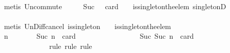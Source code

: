 \begin{isabellebody}
\ \ \ \ \ \ \ \ \ \ \ \ \isamarkupfalse%
\ {\isacharparenleft}metis\ Un{\isacharunderscore}commute\ {\isacartoucheopen}{\isasymnot}\ {\isasymsigma}\ {\isasymsubseteq}\ {\isasymsigma}{\isacharprime}\ {\isasymand}\ Suc\ {}\ {\isacharequal}\ card\ {\isacharparenleft}{\isasymsigma}\ {\isacharminus}\ {\isasymsigma}{\isacharprime}{\isacharparenright}{\isacartoucheclose}\ is{\isacharunderscore}singleton{\isacharunderscore}the{\isacharunderscore}elem\ singletonD{\isacharparenright}\isanewline
\ \ \ \ \ \ \ \ \ \ \isamarkupfalse%
\ \isamarkupfalse%
\ {\isachardoublequoteopen}{\isasymsigma}\ {\isasymunion}\ {\isasymsigma}{\isacharprime}\ {\isasymin}\ {\isasymSigma}{\isachardoublequoteclose}\isanewline
\ \ \ \ \ \ \ \ \ \ \ \ \isamarkupfalse%
\ {\isacharparenleft}metis\ Un{\isacharunderscore}Diff{\isacharunderscore}cancel{}\ {\isacartoucheopen}is{\isacharunderscore}singleton\ {\isacharparenleft}{\isasymsigma}\ {\isacharminus}\ {\isasymsigma}{\isacharprime}{\isacharparenright}{\isacartoucheclose}\ is{\isacharunderscore}singleton{\isacharunderscore}the{\isacharunderscore}elem{\isacharparenright}\ \ \ \isanewline
\ \ \ \ \ \ \ \ \isamarkupfalse%
\ \isanewline
\ \ \ \ \ \ \ \ \ \ \isamarkupfalse%
\ {\isachardoublequoteopen}{\isasymAnd}n{\isachardot}\ {\isasymforall}{\isasymsigma}{\isasymin}{\isasymSigma}{\isachardot}\ {\isasymforall}{\isasymsigma}{\isacharprime}{\isasymin}{\isasymSigma}{\isachardot}\ {\isasymnot}\ {\isasymsigma}\ {\isasymsubseteq}\ {\isasymsigma}{\isacharprime}\ {\isasymand}\ Suc\ n\ {\isacharequal}\ card\ {\isacharparenleft}{\isasymsigma}\ {\isacharminus}\ {\isasymsigma}{\isacharprime}{\isacharparenright}\ {\isasymlongrightarrow}\ {\isasymsigma}\ {\isasymunion}\ {\isasymsigma}{\isacharprime}\ {\isasymin}\ {\isasymSigma}\ {\isasymLongrightarrow}\ {\isasymforall}{\isasymsigma}{\isasymin}{\isasymSigma}{\isachardot}\ {\isasymforall}{\isasymsigma}{\isacharprime}{\isasymin}{\isasymSigma}{\isachardot}\ {\isasymnot}\ {\isasymsigma}\ {\isasymsubseteq}\ {\isasymsigma}{\isacharprime}\ {\isasymand}\ Suc\ {\isacharparenleft}Suc\ n{\isacharparenright}\ {\isacharequal}\ card\ {\isacharparenleft}{\isasymsigma}\ {\isacharminus}\ {\isasymsigma}{\isacharprime}{\isacharparenright}\ {\isasymlongrightarrow}\ {\isasymsigma}\ {\isasymunion}\ {\isasymsigma}{\isacharprime}\ {\isasymin}\ {\isasymSigma}{\isachardoublequoteclose}\isanewline
\ \ \ \ \ \ \ \ \ \ \ \ \isamarkupfalse%
\ {\isacharparenleft}rule{\isacharcomma}\ rule{\isacharcomma}\ rule{\isacharparenright}\isanewline

\end{isabellebody}
